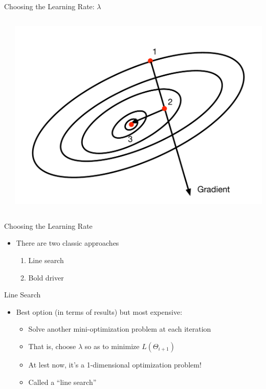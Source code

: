 \documentclass[aspectratio=169]{beamer}
\begin{document}
\begin{frame}[fragile]{Choosing the Learning Rate: $\lambda$}
\begin{columns}[c]
\begin{column}{0.3\textwidth}
\end{column}
\begin{column}{0.3\textwidth}
\includegraphics[width=1\textwidth]{lectGD/justRight.pdf}\\
\end{column}
\end{columns}

\end{frame}
\begin{frame}[fragile]{Choosing the Learning Rate}

\begin{itemize}
\item There are two classic approaches
\begin{enumerate}
\item Line search
\item Bold driver
\end{enumerate}
\end{itemize}

\end{frame}
\begin{frame}{Line Search}
\begin{itemize}
\item Best option (in terms of results) but most expensive:
	\begin{itemize}
	\item Solve another mini-optimization problem at each iteration
	\item That is, choose $\lambda$ so as to minimize $L(\Theta_{i + 1})$
	\item At lest now, it's a 1-dimensional optimization problem!
	\item Called a ``line search''
	\end{itemize}
\end{itemize}
	
\end{frame}
\end{document}

